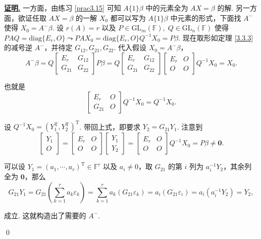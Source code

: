 \documentclass[10pt,openany]{article}
\theoremstyle{thmstyle} %
\theoremstyle{defstyle} %
\theoremstyle{prostyle} %
\theoremstyle{exastyle}
\theoremstyle{remstyle}
\renewenvironment{proof}[1][证明]{\par\underline{\textbf{#1.}} \;\fangsong}{\qed\par}
\newcommand{\T}{^{\text{T}}}
\newcommand{\F}{\mathbb{F}}
\newcommand{\gfn}{\text{GL}_n(\mathbb{F})}
\newcommand{\gfm}{\text{GL}_m(\mathbb{F})}
\newcommand{\diag}{\mathrm{diag}}
\begin{document}
\begin{proof}
	一方面，由练习 \ref{prac3.15} 可知 \( A\{1\}\beta \) 中的元素全为 \( AX=\beta \) 的解. 另一方面，欲证任取 \( AX=\beta \) 的一解 \( X_0 \) 都可以写为 \( A\{1\}\beta \) 中元素的形式，下面找 \( A^{-} \) 使得 \( X_0=A^{-}\beta \). 设 \( r(A)=r \) 以及 \( P \in \gfm,\; Q \in \gfn \) 使得 \( PAQ=\diag\{E_r,O\} \leadsto PAX_0=\diag\{E_r,O\}Q^{-1}X_0=P\beta \). 现在取形如定理 \ref{3.3.3} 的减号逆 \( A^{-} \)，并待定 \( G_{12}, G_{21}, G_{22} \). 代入假设 \( X_0=A^{-}\beta \)，
	\[ A^{-}\beta=Q\begin{bmatrix}
		E_r & G_{12} \\
		G_{21} & G_{22}
	\end{bmatrix}P\beta=Q\begin{bmatrix}
	E_r & G_{12} \\
	G_{21} & G_{22}
	\end{bmatrix}\begin{bmatrix}
	E_r & O \\
	O & O
	\end{bmatrix}Q^{-1}X_0=X_0. \]
	
	也就是
	\[ \begin{bmatrix}
		E_r & O \\
		G_{21} & O
	\end{bmatrix}Q^{-1}X_0=Q^{-1}X_0. \]
	
	设 \( Q^{-1}X_0=(Y_1\T,Y_2\T)\T \). 带回上式，即要求 \( Y_2=G_{21}Y_1 \). 注意到
	\[ \begin{bmatrix}
		Y_1 \\ O
	\end{bmatrix}=\begin{bmatrix}
	E_r & O \\
    O & O
	\end{bmatrix}\begin{bmatrix}
	Y_1 \\ Y_2
	\end{bmatrix}=\begin{bmatrix}
	E_r & O \\
	O & O
	\end{bmatrix}Q^{-1}X_0=P\beta \neq \bm{0}. \]
	
	可以设 \( Y_1=(a_1,\cdots,a_r)\T \in \F^r \) 以及 \( a_i \neq 0 \)，取 \( G_{21} \) 的第 \( i \) 列为 \( a_i^{-1}Y_2 \)，其余列全为 \( \bm{0} \)，那么
	\[ G_{21}Y_1=G_{21} \left( \sum_{k=1}^{r} a_k\varepsilon_k \right)= \sum_{k=1}^{r} a_k (G_{21}\varepsilon_k)= a_i (G_{21}\varepsilon_i)=a_i( a_i^{-1}Y_2)=Y_2, \]
	
	成立. 这就构造出了需要的 \( A^{-} \).
	
\end{proof}
\end{document}
